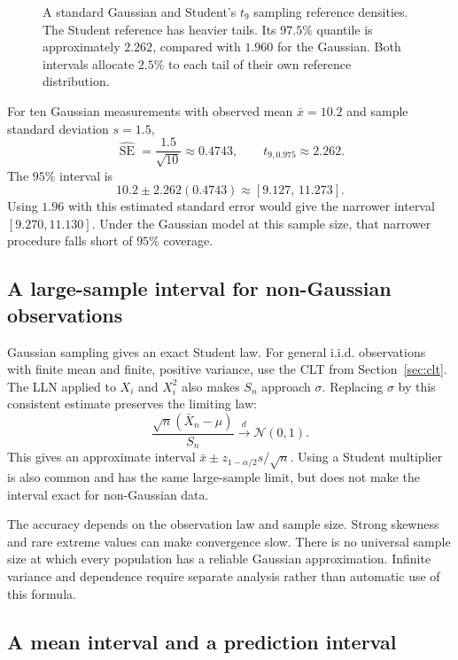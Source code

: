 \begin{figure}[H]
  \centering\InfStudentPlot
  \caption{A standard Gaussian and Student's \(t_9\) sampling reference
  densities. The Student reference has heavier tails. Its \(97.5\%\)
  quantile is approximately \(2.262\), compared with \(1.960\) for the
  Gaussian. Both intervals allocate \(2.5\%\) to each tail of their
  own reference distribution.}
  \label{fig:interval-student}
\end{figure}

For ten Gaussian measurements with observed mean \(\bar x=10.2\)
and sample standard deviation \(s=1.5\),
\[
  \widehat{\operatorname{SE}}=\frac{1.5}{\sqrt{10}}\approx0.4743,
  \qquad t_{9,0.975}\approx2.262.
\]
The \(95\%\) interval is
\[
  10.2\pm2.262(0.4743)\approx[9.127,\,11.273].
\]
Using \(1.96\) with this estimated standard error would give the
narrower interval \([9.270,11.130]\). Under the Gaussian model at
this sample size, that narrower procedure falls short of \(95\%\)
coverage.

\subsection{A large-sample interval for non-Gaussian observations}

Gaussian sampling gives an exact Student law. For general i.i.d.
observations with finite mean and finite, positive variance, use the
CLT from Section~\ref{sec:clt}. The LLN applied to \(X_i\) and
\(X_i^2\) also makes \(S_n\) approach \(\sigma\). Replacing
\(\sigma\) by this consistent estimate preserves the limiting law:
\[
  \frac{\sqrt n(\bar X_n-\mu)}{S_n}
  \xrightarrow{d}\mathcal N(0,1).
\]
This gives an approximate interval
\(\bar x\pm z_{1-\alpha/2}s/\sqrt n\). Using a Student multiplier
is also common and has the same large-sample limit, but does not make
the interval exact for non-Gaussian data.

The accuracy depends on the observation law and sample size. Strong
skewness and rare extreme values can make convergence slow. There is
no universal sample size at which every population has a reliable
Gaussian approximation. Infinite variance and dependence require
separate analysis rather than automatic use of this formula.

\subsection{A mean interval and a prediction interval}

